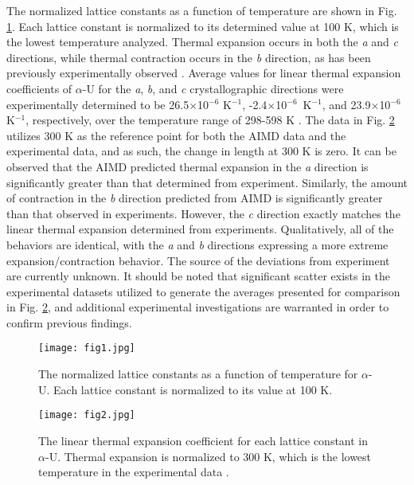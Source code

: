 \documentclass[utf8]{frontiersSCNS} %
\begin{document}
The normalized lattice constants as a function of temperature are shown in Fig. \ref{fig:a0}. Each lattice constant is normalized to its determined value at 100 K, which is the lowest temperature analyzed. Thermal expansion occurs in both the \textit{a} and \textit{c} directions, while thermal contraction occurs in the \textit{b} direction, as has been previously experimentally observed \cite{grenthe2010}. Average values for linear thermal expansion coefficients of $\alpha$-U for the \textit{a}, \textit{b}, and \textit{c} crystallographic directions were experimentally determined to be 26.5$\times$10$^{-6}$ K$^{-1}$, \mbox{-2.4$\times$10$^{-6}$ K$^{-1}$}, and 23.9$\times$10$^{-6}$ K$^{-1}$, respectively, over the temperature range of 298-598 K \cite{grenthe2010, lloyd1966}. The data in Fig. \ref{fig:exp} utilizes 300 K as the reference point for both the AIMD data and the experimental data, and as such, the change in length at 300 K is zero. It can be observed that the AIMD predicted thermal expansion in the \textit{a} direction is significantly greater than that determined from experiment. Similarly, the amount of contraction in the \textit{b} direction predicted from AIMD is significantly greater than that observed in experiments. However, the \textit{c} direction exactly matches the linear thermal expansion determined from experiments. Qualitatively, all of the behaviors are identical, with the \textit{a} and \textit{b} directions expressing a more extreme expansion/contraction behavior. The source of the deviations from experiment are currently unknown. It should be noted that significant scatter exists in the experimental datasets utilized to generate the averages presented for comparison in Fig. \ref{fig:exp}, and additional experimental investigations are warranted in order to confirm previous findings.

 \begin{figure}[hbt]
	\centering
	\texttt{[image: fig1.jpg]}
    \caption{The normalized lattice constants as a function of temperature for $\alpha$-U. Each lattice constant is normalized to its value at 100 K.}\label{fig:a0}
\end{figure}



 \begin{figure}[hbt]
	\centering
	\texttt{[image: fig2.jpg]}
    \caption{The linear thermal expansion coefficient for each lattice constant in $\alpha$-U. Thermal expansion is normalized to 300 K, which is the lowest temperature in the experimental data \cite{grenthe2010, lloyd1966}. }\label{fig:exp}
\end{figure}
\end{document}
